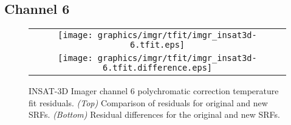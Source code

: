 \subsection{Channel 6}
\begin{figure}[H]
  \label{fig:imgr_ch6_tfit}
  \centering
  \begin{tabular}{c}
    \texttt{[image: graphics/imgr/tfit/imgr\_insat3d-6.tfit.eps]} \\
    \texttt{[image: graphics/imgr/tfit/imgr\_insat3d-6.tfit.difference.eps]}
  \end{tabular}
  \caption{INSAT-3D Imager channel 6 polychromatic correction temperature fit residuals. \emph{(Top)} Comparison of residuals for original and new SRFs. \emph{(Bottom)} Residual differences for the original and new SRFs.}
\end{figure}
